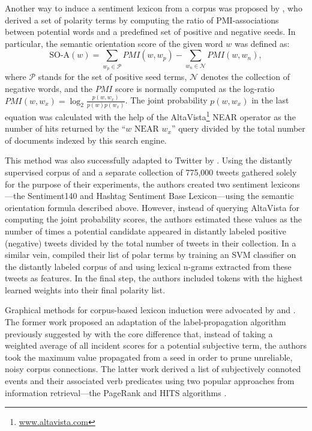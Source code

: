 Another way to induce a sentiment lexicon from a corpus was proposed
by \citet{Turney:03}, who derived a set of polarity terms by computing
the ratio of PMI-associations between potential words and a predefined
set of positive and negative seeds.  In particular, the semantic
orientation score of the given word $w$ was defined as:
\begin{equation*}
  \textrm{SO-A}(w) = \sum_{w_p\in\mathcal{P}}PMI(w, w_p) - \sum_{w_n\in\mathcal{N}}PMI(w, w_n),
\end{equation*}
where $\mathcal{P}$ stands for the set of positive seed terms,
$\mathcal{N}$ denotes the collection of negative words, and the $PMI$
score is normally computed as the log-ratio
$PMI(w, w_x) = \log_2\frac{p(w, w_x)}{p(w)p(w_x)}$.  The joint
probability $p(w, w_x)$ in the last equation was calculated with the
help of the AltaVista\footnote{\url{www.altavista.com}} NEAR operator
as the number of hits returned by the ``$w\textrm{ NEAR }w_x$'' query
divided by the total number of documents indexed by this search
engine.

This method was also successfully adapted to Twitter by
\citet{Kiritchenko:14}.  Using the distantly supervised corpus of
\citet{Go:09} and a separate collection of 775,000 tweets gathered
solely for the purpose of their experiments, the authors created two
sentiment lexicons---the Sentiment140 and Hashtag Sentiment Base
Lexicon---using the semantic orientation formula described above.
However, instead of querying AltaVista for computing the joint
probability scores, the authors estimated these values as the number
of times a potential candidate appeared in distantly labeled positive
(negative) tweets divided by the total number of tweets in their
collection.  In a similar vein, \citet{Severyn:15a} compiled their
list of polar terms by training an SVM classifier on the distantly
labeled corpus of \citet{Go:09} and using lexical n-grams extracted
from these tweets as features.  In the final step, the authors
included tokens with the highest learned weights into their final
polarity list.

Graphical methods for corpus-based lexicon induction were advocated by
\citet{Velikovich:10} and \citet{Feng:11}.  The former work proposed
an adaptation of the label-propagation algorithm previously suggested
by \citet{Rao:09} with the core difference that, instead of taking a
weighted average of all incident scores for a potential subjective
term, the authors took the maximum value propagated from a seed in
order to prune unreliable, noisy corpus connections.  The latter work
derived a list of subjectively connoted events and their associated
verb predicates using two popular approaches from information
retrieval---the PageRank \cite{Brin:98} and HITS algorithms
\cite{Kleinberg:99}.

